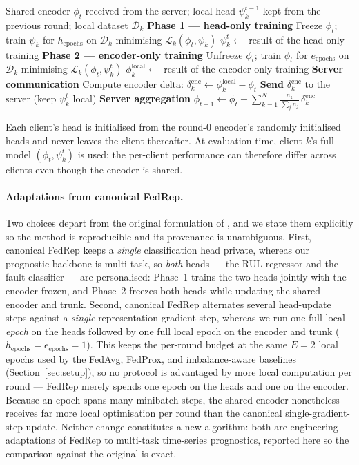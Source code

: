 \documentclass[a4paper,fleqn,doubleblind]{cas-sc}
\begin{document}
\begin{algorithm}[!ht]
\caption{FedRep local update for client $k$ at round $t$.}
\label{alg:fedrep}
\begin{algorithmic}[1]
\Require Shared encoder $\phi_t$ received from the server; local head $\psi_k^{t-1}$ kept from the previous round; local dataset $\mathcal{D}_k$
\Statex \textbf{Phase 1 --- head-only training}
\State Freeze $\phi_t$; train $\psi_k$ for $h_{\mathrm{epochs}}$ on $\mathcal{D}_k$ minimising $\mathcal{L}_k(\phi_t, \psi_k)$
\State $\psi_k^t \gets$ result of the head-only training
\Statex \textbf{Phase 2 --- encoder-only training}
\State Unfreeze $\phi_t$; train $\phi_t$ for $e_{\mathrm{epochs}}$ on $\mathcal{D}_k$ minimising $\mathcal{L}_k(\phi_t, \psi_k^t)$
\State $\phi_k^{\mathrm{local}} \gets$ result of the encoder-only training
\Statex \textbf{Server communication}
\State Compute encoder delta: $\delta^{\mathrm{enc}}_k \gets \phi_k^{\mathrm{local}} - \phi_t$
\State \textbf{Send} $\delta^{\mathrm{enc}}_k$ to the server (keep $\psi_k^t$ local)
\Statex \textbf{Server aggregation}
\State $\phi_{t+1} \gets \phi_t + \sum_{k=1}^{N} \frac{n_k}{\sum_{j} n_j}\, \delta^{\mathrm{enc}}_k$
\end{algorithmic}
\end{algorithm}

Each client's head is initialised from the round-0 encoder's
randomly initialised heads and never leaves the client thereafter.
At evaluation time, client $k$'s full model $(\phi_t, \psi_k^t)$ is
used; the per-client performance can therefore differ across clients
even though the encoder is shared.

\paragraph{Adaptations from canonical FedRep.}
Two choices depart from the original formulation of
\citet{Collins2021FedRep}, and we state them explicitly so the method
is reproducible and its provenance is unambiguous. First, canonical
FedRep keeps a \emph{single} classification head private, whereas our
prognostic backbone is multi-task, so \emph{both} heads --- the RUL
regressor and the fault classifier --- are personalised: Phase~1
trains the two heads jointly with the encoder frozen, and Phase~2
freezes both heads while updating the shared encoder and trunk.
Second, canonical FedRep alternates several head-update steps against
a \emph{single} representation gradient step, whereas we run one full
local \emph{epoch} on the heads followed by one full local epoch on
the encoder and trunk
($h_{\mathrm{epochs}} = e_{\mathrm{epochs}} = 1$). This keeps the
per-round budget at the same $E = 2$ local epochs used by the FedAvg,
FedProx, and imbalance-aware baselines (Section~\ref{sec:setup}), so
no protocol is advantaged by more local computation per round ---
FedRep merely spends one epoch on the heads and one on the encoder.
Because an epoch spans many minibatch steps, the shared encoder
nonetheless receives far more local optimisation per round than the
canonical single-gradient-step update. Neither change constitutes a
new algorithm: both are engineering adaptations of FedRep to
multi-task time-series prognostics, reported here so the comparison
against the original is exact.
\end{document}
